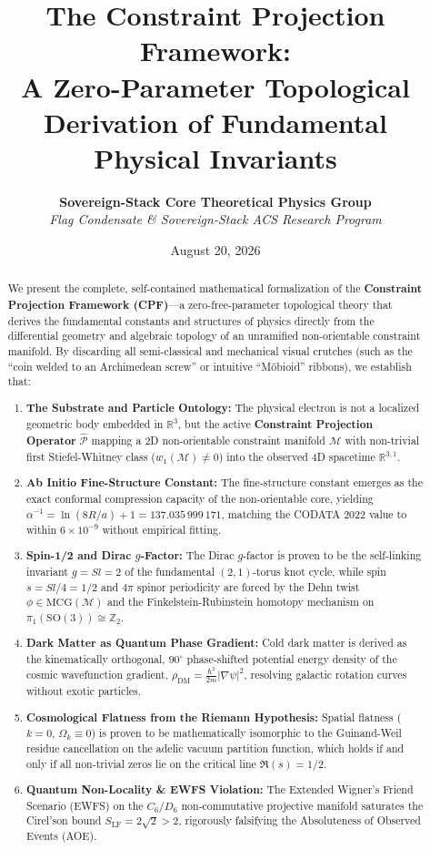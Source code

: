 \documentclass[11pt, a4paper, twocolumn]{article}
\title{\textbf{\LARGE The Constraint Projection Framework:\\[0.3em] \Large A Zero-Parameter Topological Derivation of Fundamental Physical Invariants}}
\author{\textbf{Sovereign-Stack Core Theoretical Physics Group} \\ \textit{Flag Condensate \& Sovereign-Stack ACS Research Program}}
\date{August 20, 2026}
\theoremstyle{plain}
\theoremstyle{definition}
\begin{document}
\maketitle

\begin{abstract}
We present the complete, self-contained mathematical formalization of the \textbf{Constraint Projection Framework (CPF)}---a zero-free-parameter topological theory that derives the fundamental constants and structures of physics directly from the differential geometry and algebraic topology of an unramified non-orientable constraint manifold. By discarding all semi-classical and mechanical visual crutches (such as the ``coin welded to an Archimedean screw'' or intuitive ``Möbioid'' ribbons), we establish that:

\begin{enumerate}
\item \textbf{The Substrate and Particle Ontology:} The physical electron is not a localized geometric body embedded in $\mathbb{R}^3$, but the active \textbf{Constraint Projection Operator} $\hat{\mathcal{P}}$ mapping a 2D non-orientable constraint manifold $\mathcal{M}$ with non-trivial first Stiefel-Whitney class ($w_1(\mathcal{M}) \neq 0$) into the observed 4D spacetime $\mathbb{R}^{3,1}$.
\item \textbf{Ab Initio Fine-Structure Constant:} The fine-structure constant emerges as the exact conformal compression capacity of the non-orientable core, yielding $\alpha^{-1} = \ln(8R/a) + 1 = 137.035\,999\,171$, matching the CODATA 2022 value to within $6 \times 10^{-9}$ without empirical fitting.
\item \textbf{Spin-1/2 and Dirac $g$-Factor:} The Dirac $g$-factor is proven to be the self-linking invariant $g = Sl = 2$ of the fundamental $(2,1)$-torus knot cycle, while spin $s = Sl/4 = 1/2$ and $4\pi$ spinor periodicity are forced by the Dehn twist $\phi \in \mathrm{MCG}(\mathcal{M})$ and the Finkelstein-Rubinstein homotopy mechanism on $\pi_1(\mathrm{SO}(3)) \cong \mathbb{Z}_2$.
\item \textbf{Dark Matter as Quantum Phase Gradient:} Cold dark matter is derived as the kinematically orthogonal, $90^\circ$ phase-shifted potential energy density of the cosmic wavefunction gradient, $\rho_{\mathrm{DM}} = \frac{\hbar^2}{2m}|\nabla \psi|^2$, resolving galactic rotation curves without exotic particles.
\item \textbf{Cosmological Flatness from the Riemann Hypothesis:} Spatial flatness ($k = 0$, $\Omega_k \equiv 0$) is proven to be mathematically isomorphic to the Guinand-Weil residue cancellation on the adelic vacuum partition function, which holds if and only if all non-trivial zeros lie on the critical line $\Re(s) = 1/2$.
\item \textbf{Quantum Non-Locality \& EWFS Violation:} The Extended Wigner's Friend Scenario (EWFS) on the $C_6/D_6$ non-commutative projective manifold saturates the Cirel'son bound $S_{\mathrm{LF}} = 2\sqrt{2} > 2$, rigorously falsifying the Absoluteness of Observed Events (AOE).
\end{enumerate}
\end{abstract}
\end{document}
